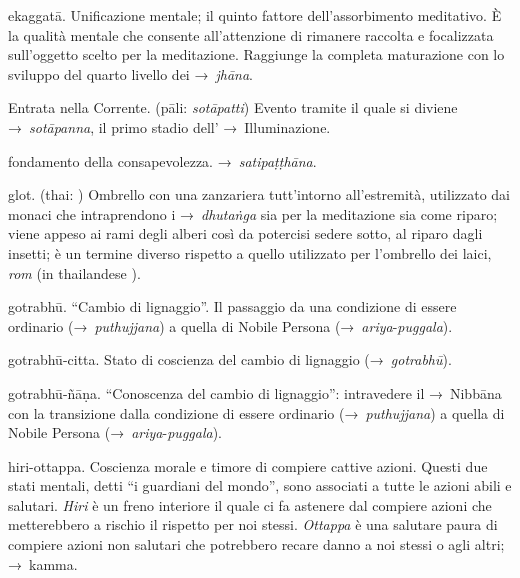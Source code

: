 \begin{glossarydescription}

\item[ekaggatā.] Unificazione mentale; il quinto fattore dell'assorbimento
  meditativo. È la qualità mentale che consente all'attenzione di rimanere
  raccolta e focalizzata sull'oggetto scelto per la meditazione. Raggiunge la
  completa maturazione con lo sviluppo del quarto livello dei →~\emph{jhāna}.

\item[Entrata nella Corrente.] (pāli: \emph{sotāpatti}) Evento tramite il quale
  si diviene →~\emph{sotāpanna}, il primo stadio dell' →~Illuminazione.


\item[fondamento della consapevolezza.] →~\emph{satipaṭṭhāna}.


\item[glot.] (thai: ) Ombrello con una zanzariera tutt'intorno
  all'estremità, utilizzato dai monaci che intraprendono i →~\emph{dhutaṅga} sia
  per la meditazione sia come riparo; viene appeso ai rami degli alberi così da
  potercisi sedere sotto, al riparo dagli insetti; è un termine diverso rispetto
  a quello utilizzato per l'ombrello dei laici, \emph{rom} (in thailandese
  ).

\item[gotrabhū.] ``Cambio di lignaggio''. Il passaggio da una condizione
  di essere ordinario (→~\emph{puthujjana}) a quella di Nobile Persona
  (→~\emph{ariya}-\emph{puggala}).

\item[gotrabhū-citta.] Stato di coscienza del cambio di lignaggio
  (→~\emph{gotrabhū}).

\item[gotrabhū-ñāṇa.] ``Conoscenza del cambio di lignaggio'': intravedere
  il →~Nibbāna con la transizione dalla condizione di essere ordinario
  (→~\emph{puthujjana}) a quella di Nobile Persona
  (→~\emph{ariya}-\emph{puggala}).


\item[hiri-ottappa.] Coscienza morale e timore di compiere cattive azioni.
  Questi due stati mentali, detti ``i guardiani del mondo'', sono associati a
  tutte le azioni abili e salutari. \emph{Hiri} è un freno interiore il quale ci
  fa astenere dal compiere azioni che metterebbero a rischio il rispetto per noi
  stessi. \emph{Ottappa} è una salutare paura di compiere azioni non salutari
  che potrebbero recare danno a noi stessi o agli altri; →~kamma.


\end{glossarydescription}
